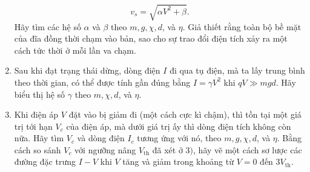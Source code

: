 \begin{vd}
\begin{enumerate}[1)]
    \[{v}_{{s}} = \sqrt{\alpha V^{2} + \beta}.\]
    Hãy tìm các hệ số $\alpha$ và $\beta$ theo $m, g, \chi , d$, và $\eta$. Giả thiết rằng toàn bộ bề mặt của đĩa đồng thời chạm vào bản, sao cho sự trao đổi điện tích xảy ra một cách tức thời ở mỗi lần va chạm.
    \item Sau khi đạt trạng thái dừng, dòng điện $I$ đi qua tụ điện, mà ta lấy trung bình theo thời gian, có thể được tính gần đúng bằng $I=\gamma V^{2}$ khi $q V \gg m g d$. Hãy biểu thị hệ số $\gamma$ theo $m, \chi , d$, và $\eta$.
    \item Khi điện áp $V$ đặt vào bị giảm đi (một cách cực kì chậm), thì tồn tại một giá trị tới hạn $V_{c}$ của điện áp, mà dưới giá trị ấy thì dòng điện tích không còn nữa. Hãy tìm $V_{{c}}$ và dòng điện $I_{c}$ tương ứng với nó, theo $m, g, \chi, d$, và $\eta$. Bằng cách so sánh $V_{c}$ với ngưỡng nâng $V_{\mathrm{th}}$ đã xét ở $3)$, hãy vẽ một cách sơ lược các đường đặc trưng $I-V$ khi $V$ tăng và giảm trong khoảng từ $V=0$ đến $3 V_{\mathrm{th}}$.
\end{enumerate}
\end{vd}
